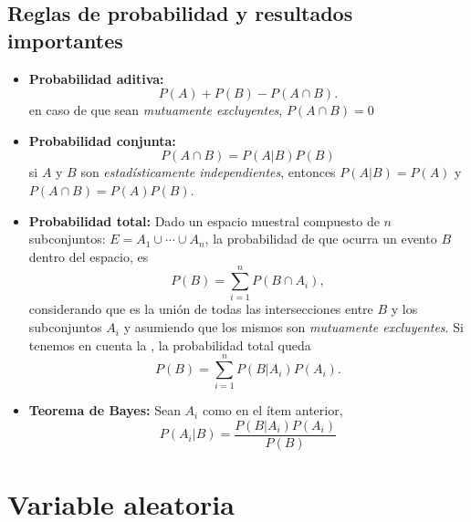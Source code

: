\documentclass[openany]{book}
\begin{document}
\section{Reglas de probabilidad y resultados importantes}
  \begin{itemize}
  \item \textbf{Probabilidad aditiva:} \begin{equation}
	P(A)+P(B)-P(A\cap B)
	\label{eq:prob-aditiva}
  .\end{equation}
  en caso de que sean \emph{mutuamente excluyentes}, $P(A\cap B)=0$
  \item \textbf{Probabilidad conjunta:} \begin{equation}
	P(A\cap B)=P(A|B)P(B)
	\label{eq:prob-conj}
  \end{equation}
  si $A$ y $B$ son \emph{estadísticamente independientes}, entonces $P(A|B)=P(A)$ y $P(A\cap B)=P(A)P(B)$.
  \item \textbf{Probabilidad total:} Dado un espacio muestral compuesto de $n$ subconjuntos: $E=A_1\cup\cdots\cup A_{n}$, la probabilidad de que ocurra un evento $B$ dentro del espacio, es \begin{equation}
	P(B)=\sum_{i=1}^{n}P(B\cap A_{i})
  ,\end{equation}
  considerando que es la unión de todas las intersecciones entre $B$ y los subconjuntos $A_{i}$ y asumiendo que los mismos son \emph{mutuamente excluyentes}. Si tenemos en cuenta la , la probabilidad total queda \begin{equation}
	P(B)=\sum_{i=1}^{n}P(B|A_{i})P(A_{i})
	\label{eq:prob-total}
  .\end{equation}
  \item \textbf{Teorema de Bayes:} Sean $A_{i}$ como en el ítem anterior, \begin{equation}
	P(A_{i}|B)=\frac{P(B|A_{i})P(A_{i})}{P(B)}
	\label{eq:bayes}
  \end{equation}
\end{itemize}

\chapter{Variable aleatoria}
\end{document}
